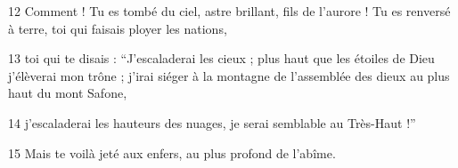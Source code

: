 
12 Comment ! Tu es tombé du ciel, astre brillant, fils de l’aurore ! Tu es renversé à terre, toi qui faisais ployer les nations,

13 toi qui te disais : “J’escaladerai les cieux ; plus haut que les étoiles de Dieu j’élèverai mon trône ; j’irai siéger à la montagne de l’assemblée des dieux au plus haut du mont Safone,

14 j’escaladerai les hauteurs des nuages, je serai semblable au Très-Haut !”

15 Mais te voilà jeté aux enfers, au plus profond de l’abîme.